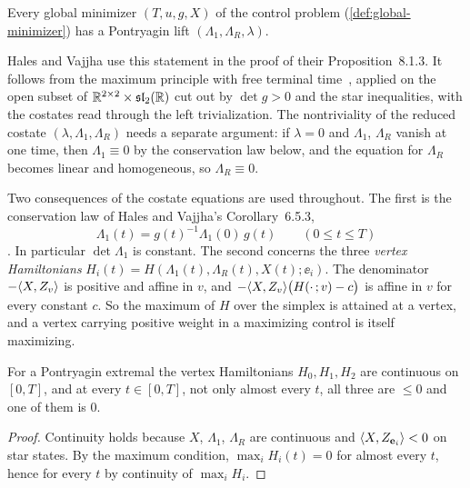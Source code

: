 \begin{theorem}\label{thm:pmp-lift}
Every global minimizer $(T,u,g,X)$ of the control problem (\cref{def:global-minimizer}) has a
Pontryagin lift $(\Lambda_1,\Lambda_R,\lambda)$.
\end{theorem}

Hales and Vajjha use this statement in the proof of their Proposition~8.1.3. It follows from the
maximum principle with free terminal time~\cite{Pontryagin1962,AgrachevSachkov2004}, applied on the
open subset of $\mathbb{R}^{2\times2}\times\mathfrak{sl}_2(\mathbb{R})$ cut out by $\det g>0$ and the star inequalities, with
the costates read through the left trivialization. The nontriviality of the reduced costate
$(\lambda,\Lambda_1,\Lambda_R)$ needs a separate argument: if $\lambda=0$ and $\Lambda_1$,
$\Lambda_R$ vanish at one time, then $\Lambda_1\equiv0$ by the conservation law below, and the
equation for $\Lambda_R$ becomes linear and homogeneous, so $\Lambda_R\equiv0$.

Two consequences of the costate equations are used throughout. The first is the conservation law
of Hales and Vajjha's Corollary~6.5.3,
\begin{equation}\label{red:conservation}
\Lambda_1(t)=g(t)^{-1}\Lambda_1(0)\,g(t)\qquad(0\le t\le T)
\end{equation}. In particular $\det\Lambda_1$ is constant. The second
concerns the three \emph{vertex Hamiltonians} $H_i(t)=H(\Lambda_1(t),\Lambda_R(t),X(t);\ee_i)$.
The denominator $-\langle X,Z_v\rangle$ is positive and affine in $v$, and
$-\langle X,Z_v\rangle\bigl(H(\cdot\,;v)-c\bigr)$ is affine in $v$ for every constant $c$. So the maximum of
$H$ over the simplex is attained at a vertex, and a vertex carrying positive weight in a maximizing
control is itself maximizing.

\begin{lemma}\label{lem:vertex-hamiltonians}
For a Pontryagin extremal the vertex Hamiltonians $H_0,H_1,H_2$ are continuous on $[0,T]$, and at
every $t\in[0,T]$, not only almost every $t$, all three are $\le0$ and one of them is $0$.
\end{lemma}

\begin{proof}
Continuity holds because $X$, $\Lambda_1$, $\Lambda_R$ are continuous and $\langle X,Z_{\mathbf{e}_i}\rangle<0$ on
star states. By the maximum condition, $\max_iH_i(t)=0$ for almost every $t$, hence for every $t$
by continuity of $\max_iH_i$.
\end{proof}

